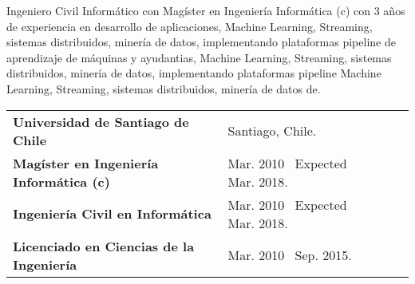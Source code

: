 \documentclass[]{cv-format}
\begin{document}
	


	\noindent Ingeniero Civil Informático con Magíster en Ingeniería Informática (c) con 3 años de experiencia en desarrollo de aplicaciones, Machine Learning, Streaming, sistemas distribuidos, minería de datos, implementando plataformas pipeline de aprendizaje de máquinas y ayudantias, Machine Learning, Streaming, sistemas distribuidos, minería de datos, implementando plataformas pipeline Machine Learning, Streaming, sistemas distribuidos, minería de datos de.

	\vspace{\separationAfterHeaderBeforeItem}
	\medskip
	\hspace{\hseparationBeforeTabular}
	\begin{tabular}[t]{llll}
		\textbf{Universidad de Santiago de Chile} & Santiago, Chile.& & \\
		\textbullet\hspace{0.4em}\textbf{Magíster en Ingeniería Informática (c)}& Mar. 2010 \textendash  \ Expected Mar. 2018. &\\ [0em]
		\textbullet\hspace{0.4em}\textbf{Ingeniería Civil en Informática} & Mar. 2010 \textendash \  Expected Mar. 2018. &\\ [0em]
		\textbullet\hspace{0.4em}\textbf{Licenciado en Ciencias de la Ingeniería} & Mar. 2010 \textendash \  Sep. 2015. &\\
	\end{tabular}
\end{document}
